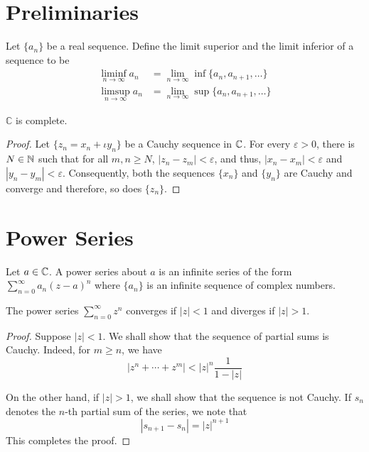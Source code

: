 \section{Preliminaries}

\begin{definition}
    Let $\{a_n\}$ be a real sequence. Define the limit superior and the limit inferior of a sequence to be 
    \begin{align*}
        \liminf_{n\to\infty} a_n &= \lim_{n\to\infty}\inf\{a_n,a_{n + 1},\ldots\}\\
        \limsup_{n\to\infty} a_n &= \lim_{n\to\infty}\sup\{a_n,a_{n + 1},\ldots\}
    \end{align*}
\end{definition}

\begin{proposition}
    $\mathbb{C}$ is complete.
\end{proposition}
\begin{proof}
    Let $\{z_n = x_n + \iota y_n\}$ be a Cauchy sequence in $\mathbb{C}$. For every $\varepsilon > 0$, there is $N\in\mathbb{N}$ such that for all $m,n\ge N$, $|z_n - z_m| <\varepsilon$, and thus, $|x_n - x_m| < \varepsilon$ and $|y_n - y_m| < \varepsilon$. Consequently, both the sequences $\{x_n\}$ and $\{y_n\}$ are Cauchy and converge and therefore, so does $\{z_n\}$.
\end{proof}

\section{Power Series}

\begin{definition}
    Let $a\in\mathbb{C}$. A power series about $a$ is an infinite series of the form $\sum\limits_{n = 0}^\infty a_n(z - a)^n$ where $\{a_n\}$ is an infinite sequence of complex numbers.
\end{definition}

\begin{example}
    The power series $\sum\limits_{n = 0}^\infty z^n$ converges if $|z| < 1$ and diverges if $|z| > 1$.
\end{example}
\begin{proof}
    Suppose $|z| < 1$. We shall show that the sequence of partial sums is Cauchy. Indeed, for $m\ge n$, we have 
    \begin{equation*}
        |z^n + \cdots + z^m| < |z|^n\frac{1}{1 - |z|}
    \end{equation*}

    On the other hand, if $|z| > 1$, we shall show that the sequence is not Cauchy. If $s_n$ denotes the $n$-th partial sum of the series, we note that 
    \begin{equation*}
        |s_{n + 1} - s_n| = |z|^{n + 1}
    \end{equation*}
    This completes the proof.
\end{proof}

